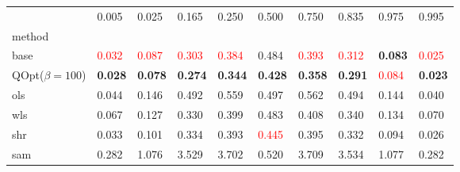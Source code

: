 \begin{tabular}{llllllllll}
\toprule
 & 0.005 & 0.025 & 0.165 & 0.250 & 0.500 & 0.750 & 0.835 & 0.975 & 0.995 \\
method &  &  &  &  &  &  &  &  &  \\
\midrule
base & \textcolor{red}{0.032} & \textcolor{red}{0.087} & \textcolor{red}{0.303} & \textcolor{red}{0.384} & 0.484 & \textcolor{red}{0.393} & \textcolor{red}{0.312} & \textbf{0.083} & \textcolor{red}{0.025} \\
\midrule
QOpt($\beta=100$) & \textbf{0.028} & \textbf{0.078} & \textbf{0.274} & \textbf{0.344} & \textbf{0.428} & \textbf{0.358} & \textbf{0.291} & \textcolor{red}{0.084} & \textbf{0.023} \\
ols & 0.044 & 0.146 & 0.492 & 0.559 & 0.497 & 0.562 & 0.494 & 0.144 & 0.040 \\
wls & 0.067 & 0.127 & 0.330 & 0.399 & 0.483 & 0.408 & 0.340 & 0.134 & 0.070 \\
shr & 0.033 & 0.101 & 0.334 & 0.393 & \textcolor{red}{0.445} & 0.395 & 0.332 & 0.094 & 0.026 \\
sam & 0.282 & 1.076 & 3.529 & 3.702 & 0.520 & 3.709 & 3.534 & 1.077 & 0.282 \\
\bottomrule
\end{tabular}